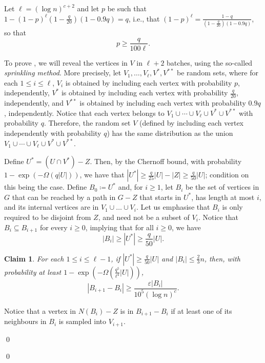 \documentclass[10pt]{article}
\theoremstyle{plain}
\numberwithin{theorem}{section}
\newtheorem{claim}{Claim}[theorem]
\theoremstyle{definition}
\theoremstyle{remark}
\renewenvironment{proof}[1][]{\begin{trivlist}
\item[\hspace{\labelsep}{\bf\noindent Proof#1.\/}] }{\qed\end{trivlist}}
\renewcommand{\setminus}{-}
\newcommand{\eps}{\varepsilon}
\theoremstyle{plain}
\begin{document}
		\begin{proof}
			Let $\ell= (\log n)^{c+2}$ and let $p$ be such that $1-(1-p)^{\ell}(1-\frac{q}{20})(1- 0.9 q)=q$, i.e., that $(1-p)^{\ell}=\frac{1-q}{(1-\frac{q}{20})(1- 0.9 q)}$, so that
			\begin{equation}\label{eqn:p15}
				p\ge \frac{q}{100 \ell}.
			\end{equation}

			To prove , we will reveal the vertices in $V$ in $\ell+2$ batches, using the so-called \emph{sprinkling method}. More precisely, let $V_1, \ldots, V_{\ell}, V^{*}, V^{**}$ be random sets, where for each $1 \le i \le \ell$, $V_i$ is obtained by including each vertex with probability $p$, independently, $V^{*}$ is obtained by including each vertex with probability $\frac{q}{20}$, independently, and $V^{**}$ is obtained by including each vertex with probability $0.9 q$, independently. Notice that each vertex belongs to $V_1 \cup \cdots \cup V_{\ell} \cup V^{*} \cup V^{**}$ with probability $q$. Therefore, the random set $V$ (defined by including each vertex independently with probability $q$) has the same distribution as the union $V_1 \cup \cdots \cup V_{\ell} \cup V^{*} \cup V^{**}$.


			Define $U^* = (U \cap V^*) \setminus Z$. Then, by the Chernoff bound, with probability $1-\exp\left(-\Omega(q|U|)\right)$, we have that $|U^*| \ge \frac{q}{25}|U| - |Z| \ge \frac{q}{50}|U|$; condition on this being the case.
			Define $B_0 \coloneqq U^*$ and, for $i \ge 1$, let $B_i$ be the set of vertices in $G$ that can be reached by a path in $G \setminus Z$ that starts in $U^*$, has length at most $i$, and its internal vertices are in $V_1 \cup \ldots \cup V_i$. Let us emphasise that $B_i$ is only required to be disjoint from $Z$, and need not be a subset of $V_i$. Notice that $B_i \subseteq B_{i+1}$ for every $i \ge 0$, implying that for all $i \ge 0$, we have $$|B_i| \ge |U^*| \ge \frac{q}{50}|U|.$$

			\begin{claim}\label{claim:Bi-expand}
				For each $1\le i\le \ell-1$, if $|U^*| \ge \frac{q}{50}|U|$ and $|B_i| \le \frac{2}{3}n$, then, with probability at least $1 - \exp\left(-\Omega\left( \frac{q^5}{\ell^4}|U| \right)\right)$,
				\begin{equation*}
					\left|B_{i+1} \setminus B_i\right| \ge \frac{\eps |B_i|}{10^5 (\log n)^c}.
				\end{equation*}
			\end{claim}
			\begin{proof}
				Notice that a vertex in $N(B_i) \setminus Z$ is in $B_{i+1} \setminus B_i$ if at least one of its neighbours in $B_i$ is sampled into $V_{i+1}$.


\end{proof}
\end{proof}
\end{document}
